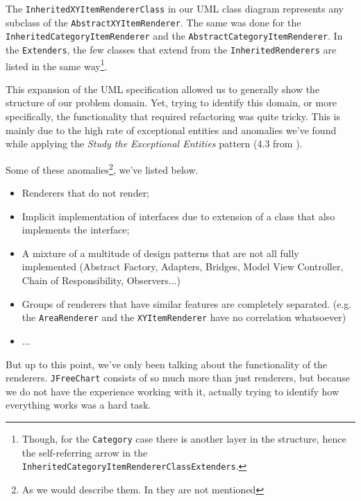 \documentclass[11pt]{article}
\begin{document}
	The \texttt{InheritedXYItemRendererClass} in our UML class diagram represents any subclass of the \texttt{AbstractXYItemRenderer}. The same was done for the \texttt{InheritedCategoryItemRenderer} and the \texttt{AbstractCategoryItemRenderer}. In the \texttt{Extenders}, the few classes that extend from the \texttt{InheritedRenderers} are listed in the same way\footnote{Though, for the \texttt{Category} case there is another layer in the structure, hence the self-referring arrow in the \texttt{InheritedCategoryItemRendererClassExtenders}.}.
	
	This expansion of the UML specification allowed us to generally show the structure of our problem domain. Yet, trying to identify this domain, or more specifically, the functionality that required refactoring was quite tricky. This is mainly due to the high rate of exceptional entities and anomalies we've found while applying the \textsl{Study the Exceptional Entities} pattern (4.3 from \cite{demeyer2009object}).
	
	Some of these anomalies\footnote{As we would describe them. In \cite{demeyer2009object} they are not mentioned}, we've listed below.
	\begin{itemize}
		\item Renderers that do not render;
		\item Implicit implementation of interfaces due to extension of a class that also implements the interface;
		\item A mixture of a multitude of design patterns that are not all fully implemented (\textsf{Abstract Factory}, \textsf{Adapters}, \textsf{Bridges}, \textsf{Model View Controller}, \textsf{Chain of Responsibility}, \textsf{Observers}...)
		\item Groups of renderers that have similar features are completely separated. (e.g. the \texttt{AreaRenderer} and the \texttt{XYItemRenderer} have no correlation whatsoever)
		\item ...
	\end{itemize}

	But up to this point, we've only been talking about the functionality of the renderers. \texttt{JFreeChart} consists of so much more than just renderers, but because we do not have the experience working with it, actually trying to identify how everything works was a hard task.
	
\end{document}
